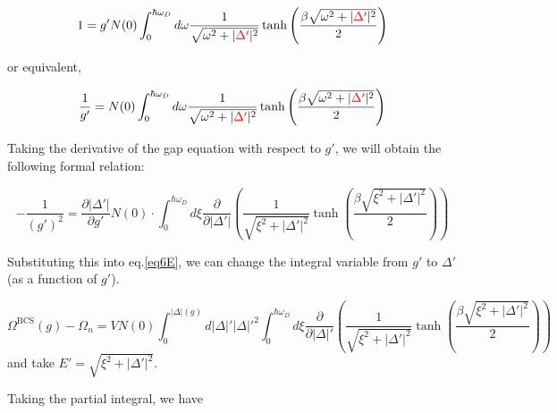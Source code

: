 \[1 = g'N(0)\int_0^{\hbar\omega_D}d\omega\frac{1}{\sqrt{\omega^2+|{\color{red}{\Delta'}}|^2}} \tanh\left(\frac{\beta\sqrt{\omega^2+|{\color{red}{\Delta'}}|^2} }{2}\right)\]

or equivalent, 

\[\frac{1}{g'} = N(0)\int_0^{\hbar\omega_D}d\omega\frac{1}{\sqrt{\omega^2+|{\color{red}{\Delta'}}|^2}} \tanh\left(\frac{\beta\sqrt{\omega^2+|{\color{red}{\Delta'}}|^2} }{2}\right)\]

Taking the derivative of the gap equation with respect to $g'$, we will obtain the following formal relation:

\[-\frac{1}{(g')^2} = \frac{\partial|\Delta'|}{\partial g'}N(0)\cdot\int_0^{\hbar\omega_D}d\xi\frac{\partial}{\partial|\Delta'|}\left(\frac{1}{\sqrt{\xi^2+|{{\Delta'}}|^2}} \tanh\left(\frac{\beta\sqrt{\xi^2+|{{\Delta'}}|^2} }{2}\right)\right) \]

Substituting this into eq.\eqref{eq6E}, we can change the integral variable from $g'$ to $\Delta'$ (as a function of $g'$). 

\[\Omega^{\text{BCS}}(g) - \Omega_n = VN(0)\int_0^{|\Delta|(g)}d|\Delta|'|\Delta|'^2\int_0^{\hbar\omega_D}d\xi\frac{\partial}{\partial |\Delta|'}\left(\frac{1}{\sqrt{\xi^2+|{{\Delta'}}|^2}} \tanh\left(\frac{\beta\sqrt{\xi^2+|{{\Delta'}}|^2} }{2}\right)\right) \]
and take $E' = \sqrt{\xi^2+|{{\Delta'}}|^2}$.

Taking the partial integral, we have

